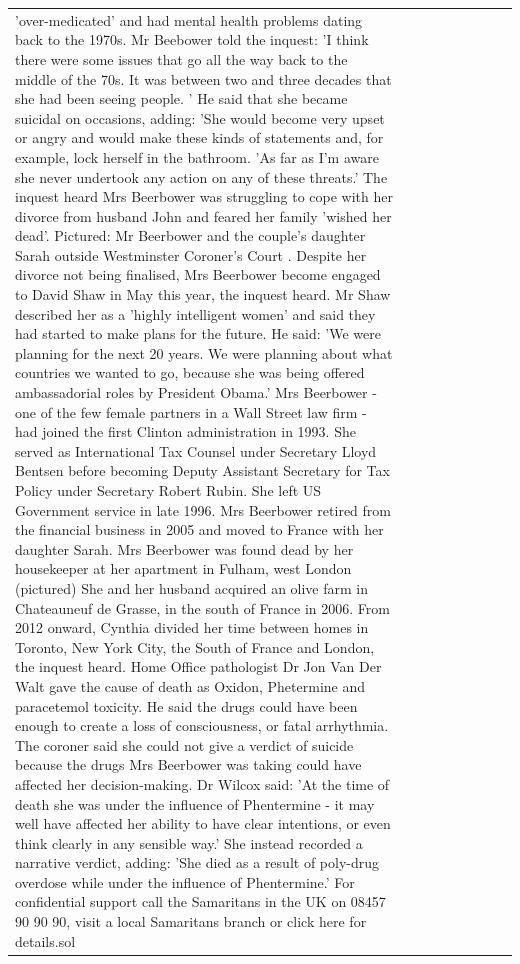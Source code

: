\begin{table}[H]
\begin{tabular}{lllrlllll}
'over-medicated' and had mental health problems dating back to the 1970s. Mr Beebower told the inquest: 'I think there were some issues that go all the way back to the middle of the 70s. It was between two and three decades that she had been seeing people. ' He said that she became suicidal on occasions, adding: 'She would become very upset or angry and would make these kinds of statements and, for example, lock herself in the bathroom. 'As far as I'm aware she never undertook any action on any of these threats.' The inquest heard Mrs Beerbower was struggling to cope with her divorce from husband John and feared her family 'wished her dead'. Pictured: Mr Beerbower and the couple's daughter Sarah outside Westminster Coroner's Court . Despite her divorce not being finalised, Mrs Beerbower become engaged to David Shaw in May this year, the inquest heard. Mr Shaw described her as a 'highly intelligent women' and said they had started to make plans for the future. He said: 'We were planning for the next 20 years. We were planning about what countries we wanted to go, because she was being offered ambassadorial roles by President Obama.' Mrs Beerbower - one of the few female partners in a Wall Street law firm - had joined the first Clinton administration in 1993. She served as International Tax Counsel under Secretary Lloyd Bentsen before becoming Deputy Assistant Secretary for Tax Policy under Secretary Robert Rubin. She left US Government service in late 1996. Mrs Beerbower retired from the financial business in 2005 and moved to France with her daughter Sarah. Mrs Beerbower was found dead by her housekeeper at her apartment in Fulham, west London (pictured) She and her husband acquired an olive farm in Chateauneuf de Grasse, in the south of France in 2006. From 2012 onward, Cynthia divided her time between homes in Toronto, New York City, the South of France and London, the inquest heard. Home Office pathologist Dr Jon Van Der Walt gave the cause of death as Oxidon, Phetermine and paracetemol toxicity. He said the drugs could have been enough to create a loss of consciousness, or fatal arrhythmia. The coroner said she could not give a verdict of suicide because the drugs Mrs Beerbower was taking could have affected her decision-making. Dr Wilcox said: 'At the time of death she was under the influence of Phentermine - it may well have affected her ability to have clear intentions, or even think clearly in any sensible way.' She instead recorded a narrative verdict, adding: 'She died as a result of poly-drug overdose while under the influence of Phentermine.' For confidential support call the Samaritans in the UK on 08457 90 90 90, visit a local Samaritans branch or click here for details.sol \\

\end{tabular}
\end{table}
